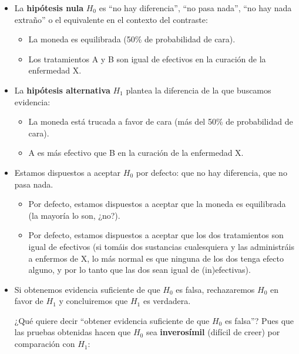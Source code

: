 \documentclass[
  spanish,
  letterpaper,
  DIV=11,
  numbers=noendperiod]{scrreprt}
\begin{document}
\begin{itemize}
\item
  La \textbf{hipótesis nula} \(H_{0}\) es ``no hay diferencia'', ``no
  pasa nada'', ``no hay nada extraño'' o el equivalente en el contexto
  del contraste:

  \begin{itemize}
  \item
    La moneda es equilibrada (50\% de probabilidad de cara).
  \item
    Los tratamientos A y B son igual de efectivos en la curación de la
    enfermedad X.
  \end{itemize}
\item
  La \textbf{hipótesis alternativa} \(H_{1}\) plantea la diferencia de
  la que buscamos evidencia:

  \begin{itemize}
  \item
    La moneda está trucada a favor de cara (más del 50\% de probabilidad
    de cara).
  \item
    A es más efectivo que B en la curación de la enfermedad X.
  \end{itemize}
\item
  Estamos dispuestos a aceptar \(H_0\) por defecto: que no hay
  diferencia, que no pasa nada.

  \begin{itemize}
  \item
    Por defecto, estamos dispuestos a aceptar que la moneda es
    equilibrada (la mayoría lo son, ¿no?).
  \item
    Por defecto, estamos dispuestos a aceptar que los dos tratamientos
    son igual de efectivos (si tomáis dos sustancias cualesquiera y las
    administráis a enfermos de X, lo más normal es que ninguna de los
    dos tenga efecto alguno, y por lo tanto que las dos sean igual de
    (in)efectivas).
  \end{itemize}
\item
  Si obtenemos evidencia suficiente de que \(H_0\) es falsa,
  rechazaremos \(H_0\) en favor de \(H_1\) y concluiremos que \(H_1\) es
  verdadera.

  ¿Qué quiere decir ``obtener evidencia suficiente de que \(H_0\) es
  falsa''? Pues que las pruebas obtenidas hacen que \(H_0\) sea
  \textbf{inverosímil} (difícil de creer) por comparación con \(H_1\):


\end{itemize}
\end{document}

